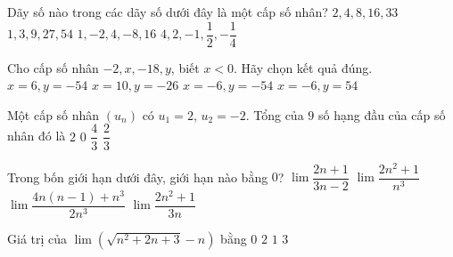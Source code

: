 \begin{ex}%
Dãy số nào trong các dãy số dưới đây là một cấp số nhân?
\choice
{$2,4,8,16,33$}
{$1,3,9,27,54$}
{\True $1,-2,4,-8,16$}
{$4,2,-1,\dfrac{1}{2},-\dfrac{1}{4}$}
\end{ex}

\begin{ex}%
Cho cấp số nhân $-2, x, -18, y$, biết $x<0$. Hãy chọn kết quả đúng.
\choice
{$x=6, y=-54$}
{$x=10, y=-26$}
{\True $x=-6, y=-54$}
{$x=-6, y=54$}
\end{ex}

\begin{ex}%
Một cấp số nhân $(u_n)$ có $u_1=2$, $u_2=-2$. Tổng của $9$ số hạng đầu của cấp số nhân đó là
\choice
{\True $2$}
{$0$}
{$\dfrac{4}{3}$}
{$\dfrac{2}{3}$}
\end{ex}

\begin{ex}%
Trong bốn giới hạn dưới đây, giới hạn nào bằng $0$?
\choice
{$\lim \dfrac{2n+1}{3n-2}$}
{\True $\lim \dfrac{2n^2+1}{n^3}$}
{$\lim \dfrac{4n(n-1)+n^3}{2n^3}$}
{$\lim \dfrac{2n^2+1}{3n}$}
\end{ex}

\begin{ex}%
Giá trị của $\lim \left(\sqrt{n^2+2n+3}-n\right)$ bằng
\choice
{$0$}
{$2$}
{\True $1$}
{$3$}
\end{ex}

